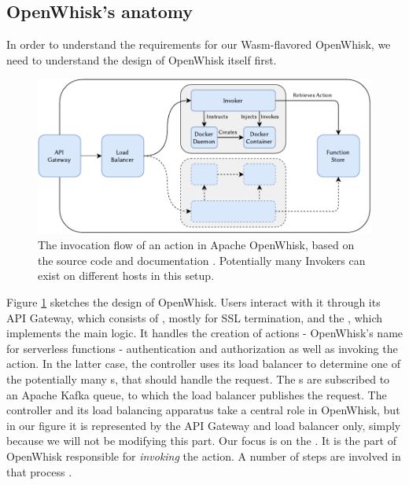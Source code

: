 \subsection{OpenWhisk's anatomy}

In order to understand the requirements for our Wasm-flavored OpenWhisk, we need to understand the design of OpenWhisk itself first.

\begin{figure}
    \centering
    \includegraphics[width=\textwidth]{figures/OpenWhiskActionInvocationFlow.pdf}
    \caption{The invocation flow of an action in Apache OpenWhisk, based on the source code and documentation \cite{OpenWhiskSystemDesign}. Potentially many Invokers can exist on different hosts in this setup.}
    \label{fig:openwhisk-action-invocation-flow}
\end{figure}

Figure \ref{fig:openwhisk-action-invocation-flow} sketches the design of OpenWhisk. Users interact with it through its API Gateway, which consists of , mostly for SSL termination, and the , which implements the main logic. It handles the creation of actions - OpenWhisk's name for serverless functions - authentication and authorization as well as invoking the action.
In the latter case, the controller uses its load balancer to determine one of the potentially many s, that should handle the request. The s are subscribed to an Apache Kafka queue, to which the load balancer publishes the request. The controller and its load balancing apparatus take a central role in OpenWhisk, but in our figure it is represented by the API Gateway and load balancer only, simply because we will not be modifying this part.
Our focus is on the . It is the part of OpenWhisk responsible for \emph{invoking} the action. A number of steps are involved in that process \cite{OpenWhiskSystemDesign}.

